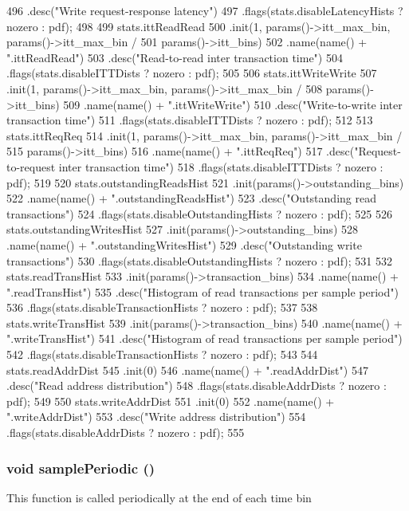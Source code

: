 \begin{DoxyCode}
{496         .desc("Write request-response latency")
497         .flags(stats.disableLatencyHists ? nozero : pdf);
498 
499     stats.ittReadRead
500         .init(1, params()->itt_max_bin, params()->itt_max_bin /
501               params()->itt_bins)
502         .name(name() + ".ittReadRead")
503         .desc("Read-to-read inter transaction time")
504         .flags(stats.disableITTDists ? nozero : pdf);
505 
506     stats.ittWriteWrite
507         .init(1, params()->itt_max_bin, params()->itt_max_bin /
508               params()->itt_bins)
509         .name(name() + ".ittWriteWrite")
510         .desc("Write-to-write inter transaction time")
511         .flags(stats.disableITTDists ? nozero : pdf);
512 
513     stats.ittReqReq
514         .init(1, params()->itt_max_bin, params()->itt_max_bin /
515               params()->itt_bins)
516         .name(name() + ".ittReqReq")
517         .desc("Request-to-request inter transaction time")
518         .flags(stats.disableITTDists ? nozero : pdf);
519 
520     stats.outstandingReadsHist
521         .init(params()->outstanding_bins)
522         .name(name() + ".outstandingReadsHist")
523         .desc("Outstanding read transactions")
524         .flags(stats.disableOutstandingHists ? nozero : pdf);
525 
526     stats.outstandingWritesHist
527         .init(params()->outstanding_bins)
528         .name(name() + ".outstandingWritesHist")
529         .desc("Outstanding write transactions")
530         .flags(stats.disableOutstandingHists ? nozero : pdf);
531 
532     stats.readTransHist
533         .init(params()->transaction_bins)
534         .name(name() + ".readTransHist")
535         .desc("Histogram of read transactions per sample period")
536         .flags(stats.disableTransactionHists ? nozero : pdf);
537 
538     stats.writeTransHist
539         .init(params()->transaction_bins)
540         .name(name() + ".writeTransHist")
541         .desc("Histogram of read transactions per sample period")
542         .flags(stats.disableTransactionHists ? nozero : pdf);
543 
544     stats.readAddrDist
545         .init(0)
546         .name(name() + ".readAddrDist")
547         .desc("Read address distribution")
548         .flags(stats.disableAddrDists ? nozero : pdf);
549 
550     stats.writeAddrDist
551         .init(0)
552         .name(name() + ".writeAddrDist")
553         .desc("Write address distribution")
554         .flags(stats.disableAddrDists ? nozero : pdf);
555 }
\end{DoxyCode}
\hypertarget{classCommMonitor_a8d8196ff6539b2e3b6deb4ae81156fc6}{
\subsubsection[{samplePeriodic}]{\setlength{\rightskip}{0pt plus 5cm}void samplePeriodic ()}}
\label{classCommMonitor_a8d8196ff6539b2e3b6deb4ae81156fc6}
This function is called periodically at the end of each time bin 


